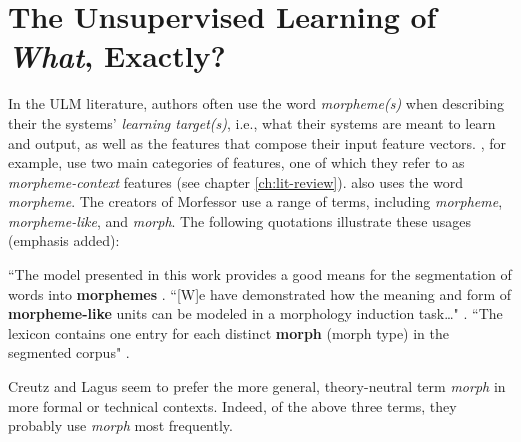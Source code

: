 

\section{The Unsupervised Learning of \textit{What}, Exactly?}
\label{sec:what-exactly}
In the \ac{ULM} literature, authors often use the word \emph{morpheme(s)} 
when describing their the systems' \emph{learning target(s)}, i.e., what their systems are meant to learn and 
output, as well as the features that compose their input feature vectors.
\cite{poon-et-al:2009}, for example, use two main categories 
of features, one of which they refer to as \emph{morpheme-context} features (see chapter \ref{ch:lit-review}).
\cite{goldsmith:2001, goldsmith:2006} also uses the word 
\emph{morpheme}.
The creators of Morfessor 
\citep{creutz-and-lagus:2002, 
creutz-and-lagus:2005, creutz-and-lagus:2007}
use a range of terms, including 
\emph{morpheme},
\emph{morpheme-like}, and \emph{morph}. The following quotations 
illustrate these usages (emphasis added):
\begin{exe}
\ex ``The model presented in this 
work provides a good means for the segmentation of words into 
\textbf{morphemes} \citep[][p. 6]{creutz-and-lagus:2007}. 
\ex``[W]e have demonstrated how the meaning and form of 
\textbf{morpheme-like} units can be modeled in a 
morphology induction task\dots" \citep{creutz-and-lagus:2005}.
\ex``The lexicon contains one entry for each distinct \textbf{morph} 
(morph type) in the 
segmented corpus" \citep[][p. 9]{creutz-and-lagus:2007}. 
\end{exe}
Creutz and Lagus seem to prefer the more general, theory-neutral term \emph{morph} 
in more formal or technical contexts. Indeed,
of the above three terms, they probably use 
\emph{morph} most frequently.


